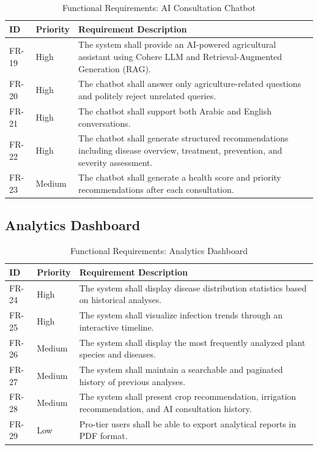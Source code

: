 \begin{table}[H]
\centering
\caption{Functional Requirements: AI Consultation Chatbot}
\label{tab:fr_chatbot}
\renewcommand{\arraystretch}{1.4}
\begin{tabularx}{\textwidth}{l l X}
\toprule
\textbf{ID} & \textbf{Priority} & \textbf{Requirement Description} \\
\midrule
FR-19 & High & The system shall provide an AI-powered agricultural assistant using Cohere LLM and Retrieval-Augmented Generation (RAG).\\
FR-20 & High & The chatbot shall answer only agriculture-related questions and politely reject unrelated queries.\\
FR-21 & High & The chatbot shall support both Arabic and English conversations.\\
FR-22 & High & The chatbot shall generate structured recommendations including disease overview, treatment, prevention, and severity assessment.\\
FR-23 & Medium & The chatbot shall generate a health score and priority recommendations after each consultation.\\
\bottomrule
\end{tabularx}
\end{table}

\subsection{Analytics Dashboard}
\label{subsec:fr_dashboard}

\begin{table}[H]
\centering
\caption{Functional Requirements: Analytics Dashboard}
\label{tab:fr_dashboard}
\renewcommand{\arraystretch}{1.4}
\begin{tabularx}{\textwidth}{l l X}
\toprule
\textbf{ID} & \textbf{Priority} & \textbf{Requirement Description} \\
\midrule
FR-24 & High & The system shall display disease distribution statistics based on historical analyses.\\
FR-25 & High & The system shall visualize infection trends through an interactive timeline.\\
FR-26 & Medium & The system shall display the most frequently analyzed plant species and diseases.\\
FR-27 & Medium & The system shall maintain a searchable and paginated history of previous analyses.\\
FR-28 & Medium & The system shall present crop recommendation, irrigation recommendation, and AI consultation history.\\
FR-29 & Low & Pro-tier users shall be able to export analytical reports in PDF format.\\
\bottomrule
\end{tabularx}
\end{table}

